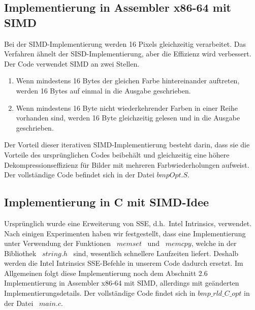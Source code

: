 \documentclass[course=erap]{aspdoc}
\begin{document}
    \subsection{Implementierung in Assembler x86-64 mit SIMD}\label{subsec:implementierung-in-assembler-x86-64-mit-simd}
    Bei der SIMD-Implementierung werden 16 Pixels gleichzeitig verarbeitet.
    Das Verfahren ähnelt der SISD-Implementierung, aber die Effizienz wird verbessert.
    \newline
    \newline
    Der Code verwendet SIMD an zwei Stellen.
    \begin{enumerate}
        \item Wenn mindestens 16 Bytes der gleichen Farbe hintereinander auftreten, werden 16 Bytes auf einmal
        in die Ausgabe geschrieben.
        \item Wenn mindestens 16 Byte nicht wiederkehrender Farben in einer Reihe vorhanden sind, werden 16 Byte
        gleichzeitig gelesen und in die Ausgabe geschrieben.
    \end{enumerate}
    \noindent Der Vorteil dieser iterativen SIMD-Implementierung besteht darin, dass sie die Vorteile des ursprünglichen Codes
    beibehält und gleichzeitig eine höhere Dekompressionseffizienz für Bilder mit mehreren Farbwiederholungen aufweist.
    \newline
    \newline
    Der vollständige Code befindet sich in der Datei $bmpOpt.S$.

    \subsection{Implementierung in C mit SIMD-Idee}\label{subsec:implementierung-in-c-mit-simd-idee}
    Ursprünglich wurde eine Erweiterung von SSE, d.h.\ Intel Intrinsics, verwendet.
    Nach einigen Experimenten haben wir festgestellt, dass eine Implementierung unter Verwendung der
    Funktionen \ $memset$ \ und \ $memcpy$, welche in der Bibliothek \ $string.h$ \ sind, wesentlich
    schnellere Laufzeiten liefert.
    \newline
    Deshalb werden die Intel Intrinsics SSE-Befehle in unserem Code dadurch ersetzt.
    \newline
    \newline
    Im Allgemeinen folgt diese Implementierung noch dem Abschnitt 2.6 Implementierung in Assembler x86-64 mit SIMD,
    allerdings mit geänderten Implementierungsdetails.
    \newline
    \newline
    Der vollständige Code findet sich in $bmp\_rld\_C\_opt$ in der Datei \ $main.c$.
\end{document}
